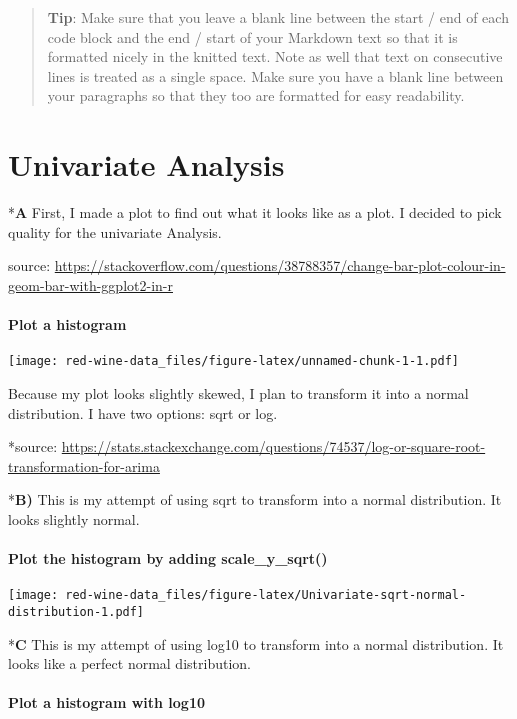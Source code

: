 \documentclass[]{article}
\let\oldparagraph\paragraph
\renewcommand{\paragraph}[1]{\oldparagraph{#1}\mbox{}}
\begin{document}
\begin{quote}
\textbf{Tip}: Make sure that you leave a blank line between the start /
end of each code block and the end / start of your Markdown text so that
it is formatted nicely in the knitted text. Note as well that text on
consecutive lines is treated as a single space. Make sure you have a
blank line between your paragraphs so that they too are formatted for
easy readability.
\end{quote}

\section{Univariate Analysis}\label{univariate-analysis}

*\textbf{A} First, I made a plot to find out what it looks like as a
plot. I decided to pick quality for the univariate Analysis.

source:
\url{https://stackoverflow.com/questions/38788357/change-bar-plot-colour-in-geom-bar-with-ggplot2-in-r}

\paragraph{Plot a histogram}\label{plot-a-histogram}

\texttt{[image: red-wine-data\_files/figure-latex/unnamed-chunk-1-1.pdf]}

Because my plot looks slightly skewed, I plan to transform it into a
normal distribution. I have two options: sqrt or log.

*source:
\url{https://stats.stackexchange.com/questions/74537/log-or-square-root-transformation-for-arima}

*\textbf{B)} This is my attempt of using sqrt to transform into a normal
distribution. It looks slightly normal.

\paragraph{Plot the histogram by adding
scale\_y\_sqrt()}\label{plot-the-histogram-by-adding-scale_y_sqrt}

\texttt{[image: red-wine-data\_files/figure-latex/Univariate-sqrt-normal-distribution-1.pdf]}

*\textbf{C} This is my attempt of using log10 to transform into a normal
distribution. It looks like a perfect normal distribution.

\paragraph{Plot a histogram with
log10}\label{plot-a-histogram-with-log10}
\end{document}
